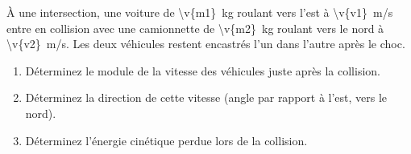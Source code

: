 À une intersection, une voiture de \qty{\v{m1}}{kg} roulant vers l'est à \qty{\v{v1}}{m/s} entre en collision avec une camionnette de \qty{\v{m2}}{kg} roulant vers le nord à \qty{\v{v2}}{m/s}. Les deux véhicules restent encastrés l'un dans l'autre après le choc.

\begin{enumerate}[label=\alph*)]
    \item Déterminez le module de la vitesse des véhicules juste après la collision.
    \item Déterminez la direction de cette vitesse (angle par rapport à l'est, vers le nord).
    \item Déterminez l'énergie cinétique perdue lors de la collision.
\end{enumerate}
